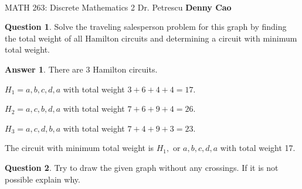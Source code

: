 \documentclass[article, 12pt]{article}
\title{\Huge\bf{\psetName}}
\author{\name}
\date{\dueDate}
\author{\name}
\date{\dueDate}
\makeatletter
\theoremstyle{definition}
\newcommand{\courseNumber}{MATH 263}
\newcommand{\courseName}{Discrete Mathematics 2}
\newcommand{\professor}{Dr. Petrescu}
\newcommand{\name}{Denny Cao}
\newtheorem{question}{Question}
\newtheorem{answer}{Answer}
\renewcommand{\maketitle}{\bgroup\setlength{\parindent}{0pt}
    \begin{flushleft}
        \textbf{\@title} \\ \vskip0.2cm
        \begingroup
            \fontsize{14pt}{12pt}\selectfont
            \courseNumber: \courseName 
            \vskip0.3cm 
            \professor
        \endgroup \vskip0.3cm
        \@date \hfill\rlap{}\bf{\name} \\ \vskip0.1cm
        \hrulefill
    \end{flushleft}\egroup 
}
\makeatother
\begin{document}
    \maketitle
    \thispagestyle{empty}

    \begin{question}
        Solve the traveling salesperson problem for this graph by finding the total weight of all Hamilton circuits and determining a circuit with minimum total weight.  
        \begin{figure}[H]
            \hfil
        \end{figure}
    \end{question}

    \begin{answer}
        There are 3 Hamilton circuits. 

        $H_1 = a,b,c,d,a$ with total weight $3 + 6 + 4 + 4 = 17$.
        
        $H_2 = a,c,b,d,a$ with total weight $7+6+9+4=26$.
        
        $H_3 = a,c,d,b,a$ with total weight $7+4+9+3=23$.

        The circuit with minimum total weight is $H_1,$ or $a,b,c,d,a$ with total weight 17.
    \end{answer}
    \begin{question}
        Try to draw the given  graph without any crossings.  If it is not possible explain why.
        \begin{figure}[H]
                \hfil
        \end{figure}
    \end{question}
    
\end{document}
